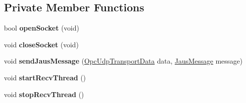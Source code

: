 \subsection*{\-Private \-Member \-Functions}
\begin{DoxyCompactItemize}
\item 
\hypertarget{class_jaus_opc_udp_interface_a5061ce56161d7c366d70442e5a3247ae}{bool {\bfseries open\-Socket} (void)}\label{class_jaus_opc_udp_interface_a5061ce56161d7c366d70442e5a3247ae}

\item 
\hypertarget{class_jaus_opc_udp_interface_ad8ff4455137ccbbffc5a094e9c5bdfab}{void {\bfseries close\-Socket} (void)}\label{class_jaus_opc_udp_interface_ad8ff4455137ccbbffc5a094e9c5bdfab}

\item 
\hypertarget{class_jaus_opc_udp_interface_aa265788183400f95fbe0c9cb61963c69}{void {\bfseries send\-Jaus\-Message} (\hyperlink{struct_opc_udp_transport_data}{\-Opc\-Udp\-Transport\-Data} data, \hyperlink{struct_jaus_message_struct}{\-Jaus\-Message} message)}\label{class_jaus_opc_udp_interface_aa265788183400f95fbe0c9cb61963c69}

\item 
\hypertarget{class_jaus_opc_udp_interface_addc6516af55c89289a82b701522e87bf}{void {\bfseries start\-Recv\-Thread} ()}\label{class_jaus_opc_udp_interface_addc6516af55c89289a82b701522e87bf}

\item 
\hypertarget{class_jaus_opc_udp_interface_a0d03e9fbeefdd858909808c6fe0bd8b4}{void {\bfseries stop\-Recv\-Thread} ()}\label{class_jaus_opc_udp_interface_a0d03e9fbeefdd858909808c6fe0bd8b4}

\end{DoxyCompactItemize}
